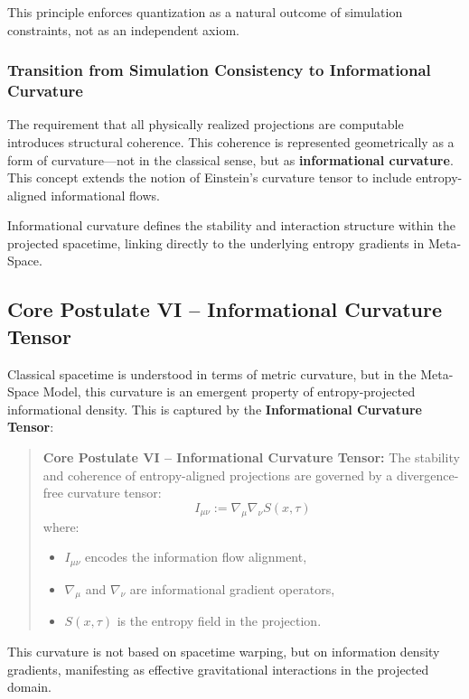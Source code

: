 \documentclass[10.5pt,a4paper]{article}
\begin{document}
This principle enforces quantization as a natural outcome of simulation constraints, not as an independent axiom.

\subsubsection*{Transition from Simulation Consistency to Informational Curvature}

The requirement that all physically realized projections are computable introduces structural coherence. This coherence is represented geometrically as a form of curvature—not in the classical sense, but as \textbf{informational curvature}. This concept extends the notion of Einstein's curvature tensor to include entropy-aligned informational flows.

Informational curvature defines the stability and interaction structure within the projected spacetime, linking directly to the underlying entropy gradients in Meta-Space.

\subsection{Core Postulate VI – Informational Curvature Tensor}

Classical spacetime is understood in terms of metric curvature, but in the Meta-Space Model, this curvature is an emergent property of entropy-projected informational density. This is captured by the \textbf{Informational Curvature Tensor}:

\begin{quote}
\textbf{Core Postulate VI – Informational Curvature Tensor:}  
The stability and coherence of entropy-aligned projections are governed by a divergence-free curvature tensor:
\[
I_{\mu\nu} := \nabla_\mu \nabla_\nu S(x, \tau)
\]
where:
\begin{itemize}
    \item \(I_{\mu\nu}\) encodes the information flow alignment,
    \item \(\nabla_\mu\) and \(\nabla_\nu\) are informational gradient operators,
    \item \(S(x, \tau)\) is the entropy field in the projection.
\end{itemize}
\end{quote}

This curvature is not based on spacetime warping, but on information density gradients, manifesting as effective gravitational interactions in the projected domain.
\end{document}
